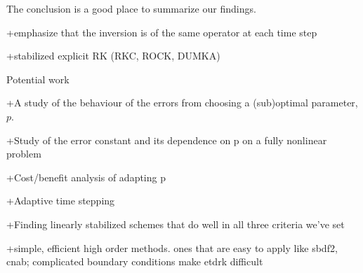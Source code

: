 \clearpage

The conclusion is a good place to summarize our findings.

+emphasize that the inversion is of the same operator at each time step
	
+stabilized explicit RK (RKC, ROCK, DUMKA)

\noindent	
Potential work

+A study of the behaviour of the errors from choosing a (sub)optimal parameter, $p$.

+Study of the error constant and its dependence on p on a fully nonlinear problem 

+Cost/benefit analysis of adapting p

+Adaptive time stepping

+Finding linearly stabilized schemes that do well in all three criteria we've set

+simple, efficient high order methods. ones that are easy to apply like sbdf2, cnab; complicated boundary conditions make etdrk difficult	

